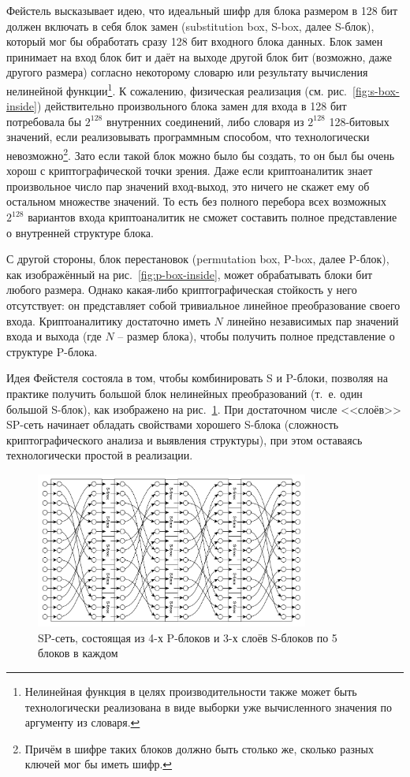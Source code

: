 Фейстель высказывает идею, что идеальный шифр для блока размером в 128 бит должен включать в себя блок замен (substitution box, S-box, далее S-блок), который мог бы обработать сразу 128 бит входного блока данных. Блок замен принимает на вход блок бит и даёт на выходе другой блок бит (возможно, даже другого размера) согласно некоторому словарю или результату вычисления нелинейной функции\footnote{Нелинейная функция в целях производительности также может быть технологически реализована в виде выборки уже вычисленного значения по аргументу из словаря.}. К сожалению, физическая реализация (см. рис.~\ref{fig:s-box-inside}) действительно произвольного блока замен для входа в 128 бит потребовала бы $2^{128}$ внутренних соединений, либо словаря из $2^{128}$ 128-битовых значений, если реализовывать программным способом, что технологически невозможно\footnote{Причём в шифре таких блоков должно быть столько же, сколько разных ключей мог бы иметь шифр.}. Зато если такой блок можно было бы создать, то он был бы очень хорош с криптографической точки зрения. Даже если криптоаналитик знает произвольное число пар значений вход-выход, это ничего не скажет ему об остальном множестве значений. То есть без полного перебора всех возможных $2^{128}$ вариантов входа криптоаналитик не сможет составить полное представление о внутренней структуре блока.

С другой стороны, блок перестановок (permutation box, P-box, далее P-блок), как изображённый на рис.~\ref{fig:p-box-inside}, может обрабатывать блоки бит любого размера. Однако какая-либо криптографическая стойкость у него отсутствует: он представляет собой тривиальное линейное преобразование своего входа. Криптоаналитику достаточно иметь $N$ линейно независимых пар значений входа и выхода (где $N$ -- размер блока), чтобы получить полное представление о структуре P-блока.

Идея Фейстеля состояла в том, чтобы комбинировать S и P-блоки, позволяя на практике получить большой блок нелинейных преобразований (т.~е. один большой S-блок), как изображено на рис.~\ref{fig:sp-network}. При достаточном числе <<слоёв>> SP-сеть начинает обладать свойствами хорошего S-блока (сложность криптографического анализа и выявления структуры), при этом оставаясь технологически простой в реализации.

\begin{figure}[htb]
	\centering
	\includegraphics[width=0.8\textwidth]{pic/sp-network}
  \caption{SP-сеть, состоящая из 4-х P-блоков и 3-х слоёв S-блоков по 5 блоков в каждом}
  \label{fig:sp-network}
\end{figure}

